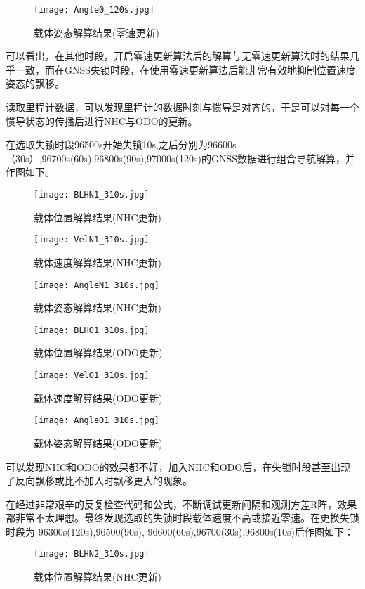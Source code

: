 \documentclass[codepkg=listings,theme=fancy]{course-report}
\begin{document}
\begin{figure}[H]
\texttt{[image: Angle0\_120s.jpg]}
\caption{载体姿态解算结果(零速更新)}
\end{figure}

可以看出，在其他时段，开启零速更新算法后的解算与无零速更新算法时的结果几乎一致，而在GNSS失锁时段，在使用零速更新算法后能非常有效地抑制位置速度姿态的飘移。

读取里程计数据，可以发现里程计的数据时刻与惯导是对齐的，于是可以对每一个惯导状态的传播后进行NHC与ODO的更新。

在选取失锁时段96500s开始失锁10s,之后分别为96600s（30s）,96700s(60s),96800s(90s),97000s(120s)的GNSS数据进行组合导航解算，并作图如下。

\begin{figure}[H]
\texttt{[image: BLHN1\_310s.jpg]}
\caption{载体位置解算结果(NHC更新)}
\end{figure}

\begin{figure}[H]
\texttt{[image: VelN1\_310s.jpg]}
\caption{载体速度解算结果(NHC更新)}
\end{figure}

\begin{figure}[H]
\texttt{[image: AngleN1\_310s.jpg]}
\caption{载体姿态解算结果(NHC更新)}
\end{figure}

\begin{figure}[H]
\texttt{[image: BLHO1\_310s.jpg]}
\caption{载体位置解算结果(ODO更新)}
\end{figure}

\begin{figure}[H]
\texttt{[image: VelO1\_310s.jpg]}
\caption{载体速度解算结果(ODO更新)}
\end{figure}

\begin{figure}[H]
\texttt{[image: AngleO1\_310s.jpg]}
\caption{载体姿态解算结果(ODO更新)}
\end{figure}

可以发现NHC和ODO的效果都不好，加入NHC和ODO后，在失锁时段甚至出现了反向飘移或比不加入时飘移更大的现象。

在经过非常艰辛的反复检查代码和公式，不断调试更新间隔和观测方差R阵，效果都非常不太理想。最终发现选取的失锁时段载体速度不高或接近零速。在更换失锁时段为
96300s(120s),96500(90s),
96600(60s),96700(30s),96800s(10s)后作图如下：
\begin{figure}[H]
\texttt{[image: BLHN2\_310s.jpg]}
\caption{载体位置解算结果(NHC更新)}
\end{figure}
\end{document}
